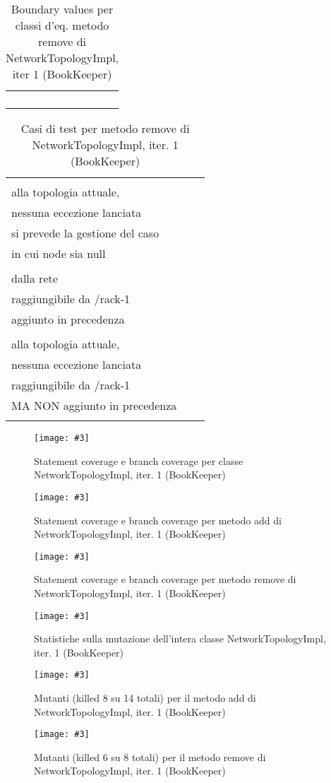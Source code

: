 \documentclass[10pt, a4paper]{article}
\newcommand{\Intmaketable}[4]{
	\begin{longtable}{#3}
	#4
	\caption{#2}
	\label{#1}
	\end{longtable}
}
\newcommand{\Intbvtable}[3]{
	\Intmaketable{#1}{#2}{|l|l|l|}{
	\hline
	\thead{Parametro formale} & \thead{Classe d'equivalenza} & \thead{Boundary value}\\
	\hline
	\hline
	#3
	\hline}
}
\newcommand{\Inttestctable}[3]{
	\Intmaketable{#1}{#2}{|l|l|l|}{
	\hline
	\thead{Input} & \thead{Esito atteso} & \thead{Motivazione}\\
	\hline
	\hline
	#3
	\hline}
}
\newcommand{\Intbvcaption}[4]{Boundary values per classi d'eq. metodo #1 di #2, iter #3 (#4)}
\newcommand{\Inttestccaption}[4]{Casi di test per metodo #1 di #2, iter. #3 (#4)}
\newcommand{\gettablelabel}[5]{table:#1:#2:#3:iter#4:proj#5}
\newcommand{\bvtable}[5]{
	\Intbvtable{\gettablelabel{bv}{#1}{#2}{#3}{#4}}
		{\Intbvcaption{#1}{#2}{#3}{#4}}
		{#5}
}
\newcommand{\testctable}[5]{
	\Inttestctable{\gettablelabel{testc}{#1}{#2}{#3}{#4}}
		{\Inttestccaption{#1}{#2}{#3}{#4}}
		{#5}
}
\newcommand{\getpicturelabel}[1]{picture:#1}
\newcommand{\makepicture}[4]{
	\begin{figure}[H]
	\centering
	\texttt{[image: \#3]}
	\caption{#4}
	\label{\getpicturelabel{#3}}
	\end{figure}
}
\newcommand{\methodcfcovcaption}[4]{Statement coverage e branch coverage per metodo #1 di #2, iter. #3 (#4)}
\newcommand{\classcfcovcaption}[3]{Statement coverage e branch coverage per classe #1, iter. #2 (#3)}
\newcommand{\mutclasscaption}[3]{Statistiche sulla mutazione dell'intera classe #1, iter. #2 (#3)}
\newcommand{\mutmethodcaption}[6]{Mutanti (killed #5 su #6 totali) per il metodo #1 di #2, iter. #3 (#4)}
\newcommand{\tcell}{\makecell[tl]}
\newcommand{\newtrow}{\\ \hline}
\def\bookkeeper{BookKeeper}
\newcommand{\ceq}[1]{\{#1\}}
\begin{document}
	\pagebreak
	
	\bvtable{remove}{NetworkTopologyImpl}{1}{\bookkeeper}{
			\tcell{node} & \tcell{\ceq{null}} & \tcell{null} 
		\newtrow
			\tcell{node} & \tcell{\ceq{nodo con path non presente in rete}} & \tcell{Node("/rack-1/bookie-1")}
		\newtrow
			\tcell{node} & \tcell{\ceq{nodo con path presente in rete}} & \tcell{Node("/rack-1/bookie-2")}
		\newtrow
	}
	
	\testctable{remove}{NetworkTopologyImpl}{1}{\bookkeeper}{
			\tcell{null} & \tcell{Nessuna variazione rispetto\\ alla topologia attuale,\\ nessuna 
			eccezione lanciata} & \tcell{Specifica della documentazione:\\ si prevede la gestione del 
			caso\\ in cui node sia null}
		\newtrow
			\tcell{buildNode("/rack-1","bookie-1")} & \tcell{Rimozione con successo del nodo\\ dalla rete} & \tcell{Il nodo è una foglia (un server bk)\\ raggiungibile da /rack-1\\ aggiunto in precedenza}
		\newtrow
			\tcell{buildNode("/rack-1","bookie-2")} & \tcell{Nessuna variazione rispetto\\ alla topologia attuale,\\ nessuna eccezione lanciata} & \tcell{Il nodo è una foglia (un server bk)\\ raggiungibile da /rack-1\\ MA NON aggiunto in precedenza}
		\newtrow
	}	
	
	\makepicture{17cm}{1.15cm}{bk/controlflow-NetworkTopologyImpl-1}
				{\classcfcovcaption{NetworkTopologyImpl}{1}{\bookkeeper}}
				
	\makepicture{17cm}{0.75cm}{bk/controlflow-add-NetworkTopologyImpl-1}
				{\methodcfcovcaption{add}{NetworkTopologyImpl}{1}{\bookkeeper}}
				
	\makepicture{17cm}{0.75cm}{bk/controlflow-remove-NetworkTopologyImpl-1}
				{\methodcfcovcaption{remove}{NetworkTopologyImpl}{1}{\bookkeeper}}
				
	\makepicture{17cm}{1.5cm}{bk/mutation-NetworkTopologyImpl-1}
				{\mutclasscaption{NetworkTopologyImpl}{1}{\bookkeeper}}
				
	\makepicture{17cm}{15cm}{bk/mutation-add-NetworkTopologyImpl-1}
				{\mutmethodcaption{add}{NetworkTopologyImpl}{1}{\bookkeeper}{8}{14}}
	
	\makepicture{17cm}{10cm}{bk/mutation-remove-NetworkTopologyImpl-1}
				{\mutmethodcaption{remove}{NetworkTopologyImpl}{1}{\bookkeeper}{6}{8}}
				
\end{document}
